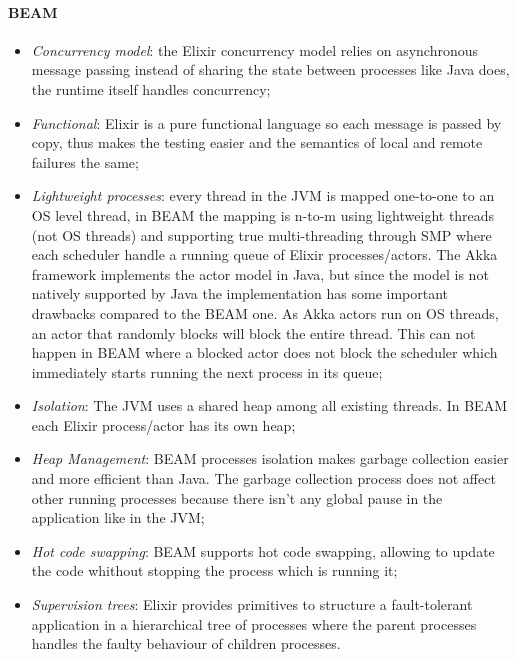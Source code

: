\paragraph{BEAM}
\begin{itemize}
    \item \textit{Concurrency model}: the Elixir concurrency model relies on 
asynchronous message passing instead of sharing the state between processes
like Java does, the runtime itself handles concurrency; 
   \item \textit{Functional}: Elixir is a pure functional language 
so each message is passed by copy, thus makes the testing easier and the semantics of 
local and remote failures the same; 
    \item \textit{Lightweight processes}: every thread in the JVM is mapped 
one-to-one to an OS level thread, in BEAM the mapping is n-to-m using 
lightweight threads (not OS threads) and supporting true multi-threading 
through SMP where each scheduler handle a running queue of Elixir 
processes/actors. The Akka framework implements the actor model in Java, but 
since the model is not natively supported by Java the implementation 
has some important drawbacks compared to the BEAM one. As Akka actors run on 
OS threads, an actor that randomly blocks will block the entire thread. This can 
not happen in BEAM where a blocked actor does not block the scheduler which 
immediately starts running the next process in its queue;  
    \item \textit{Isolation}: The JVM uses a shared heap among all existing 
threads. In BEAM each Elixir process/actor has its own heap;
    \item \textit{Heap Management}: BEAM processes isolation makes garbage 
collection easier and more efficient than Java. The garbage collection process 
does not affect other running processes because there isn't any global pause 
in the application like in the JVM;
    \item \textit{Hot code swapping}: BEAM supports hot code swapping, allowing 
to update the code whithout stopping the process which is running it;
    \item \textit{Supervision trees}: Elixir provides primitives to structure a 
fault-tolerant application in a hierarchical tree of processes where the parent
processes handles the faulty behaviour of children processes.
\end{itemize}
